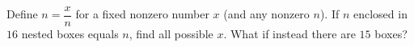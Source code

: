 Define $\boxed{n}=\dfrac {x}{n}$ for a fixed nonzero number $x$ (and any nonzero $n$). If $n$ enclosed in $16$ nested boxes equals $n$, find all possible $x$. What if instead there are $15$ boxes?
